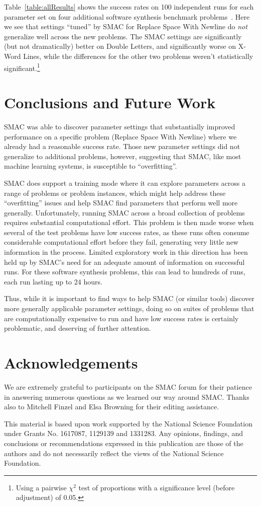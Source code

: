 Table~\ref{table:allResults} shows the success rates on 100 independent runs
for each parameter set on four additional software synthesis benchmark
problems~\cite{Helmuth:2015:GECCO}. Here we see that settings
``tuned'' by SMAC for Replace Space With Newline do \emph{not} generalize
well across the new problems. The SMAC settings are significantly
(but not dramatically) better on
Double Letters, and significantly worse on X-Word Lines, while the differences for
the other two problems weren't statistically significant.\footnote{Using a
	pairwise $\chi^2$ test of proportions with a significance level (before
	adjustment) of 0.05.}

\section{Conclusions and Future Work}
\label{sec:conclusions}

SMAC was able to discover parameter settings that substantially improved
performance on a specific problem (Replace Space With Newline) where we already
had a reasonable success rate. Those new parameter settings did not generalize
to additional problems, however, suggesting that SMAC, like most machine
learning systems, is susceptible to ``overfitting''.

SMAC does support a training mode where it can explore parameters across a range
of problems or problem instances, which might help address these ``overfitting''
issues and help SMAC find parameters that perform well more generally.
Unfortunately, running SMAC across a broad
collection of problems requires substantial computational effort. This 
problem is then made worse when several of the test problems have low success rates, as these runs often 
consume considerable computational effort before they fail, 
generating very little new information in the process.
Limited exploratory work in this direction has been held up by SMAC's need for 
an adequate amount of information on successful runs.  For these software 
synthesis problems, this can lead to hundreds of runs, each run lasting up to 
24 hours.

Thus, while it is important to find ways to help SMAC (or similar tools)
discover more generally applicable parameter settings, doing so on suites 
of problems that are computationally expensive to run and have low success rates is certainly problematic, and deserving of further attention.

\section*{Acknowledgements}
\label{sec:acknowledgements}

We are extremely grateful to participants on the SMAC forum for their patience
in answering numerous questions as we learned our way around
SMAC. Thanks also to Mitchell Finzel and Elsa Browning for their editing assistance.

This material is based upon work supported by the National Science Foundation under Grants No. 1617087, 1129139 and 1331283. Any opinions, findings, and conclusions or recommendations expressed in this publication are those of the authors and do not necessarily reflect the views of the National Science Foundation.